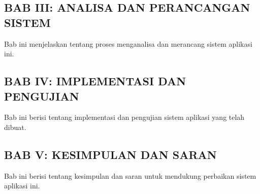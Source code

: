 \subsection*{BAB III: ANALISA DAN PERANCANGAN SISTEM}
\begin{addmargin}[0.75cm]{0em}
Bab ini menjelaskan tentang proses menganalisa dan merancang sistem aplikasi ini.
\end{addmargin}
\subsection*{BAB IV: IMPLEMENTASI DAN PENGUJIAN}
\begin{addmargin}[0.75cm]{0em}
Bab ini berisi tentang implementasi dan pengujian sistem aplikasi yang telah dibuat.
\end{addmargin}
\subsection*{BAB V: KESIMPULAN DAN SARAN}
\begin{addmargin}[0.75cm]{0em}
Bab ini berisi tentang kesimpulan dan saran untuk mendukung perbaikan sistem aplikasi ini.
\end{addmargin}

\newpage